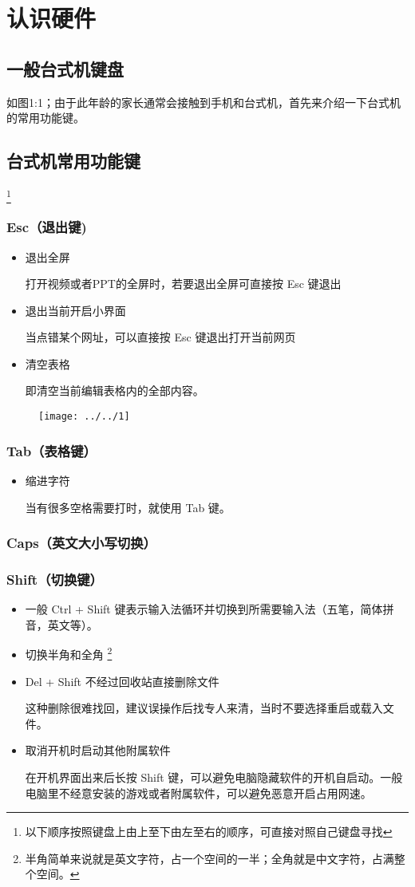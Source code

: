 \chapter{认识硬件}
\section{一般台式机键盘}
如图1:1；由于此年龄的家长通常会接触到手机和台式机，首先来介绍一下台式机的常用功能键。
\section{台式机常用功能键}
\footnote{以下顺序按照键盘上由上至下由左至右的顺序，可直接对照自己键盘寻找}
\subsection{Esc（退出键)}
\begin{itemize}
	\item 退出全屏
	
	打开视频或者PPT的全屏时，若要退出全屏可直接按 Esc 键退出
	\item 退出当前开启小界面
	
	当点错某个网址，可以直接按 Esc 键退出打开当前网页
	\item 清空表格
	
	即清空当前编辑表格内的全部内容。
\end{itemize}
\begin{figure}
	\centering
	\texttt{[image: ../../1]}
	\caption{}
	\label{fig:1}
\end{figure}
\subsection{Tab（表格键）}
\begin{itemize}
	\item 缩进字符
	
	当有很多空格需要打时，就使用 Tab 键。
\end{itemize}
\subsection{Caps（英文大小写切换）}
\subsection{Shift（切换键）}
\begin{itemize}
	\item 一般 Ctrl + Shift 键表示输入法循环并切换到所需要输入法（五笔，简体拼音，英文等）。
	\item 切换半角和全角
	\footnote{半角简单来说就是英文字符，占一个空间的一半；全角就是中文字符，占满整个空间。}
	\item Del + Shift 不经过回收站直接删除文件
	
	这种删除很难找回，建议误操作后找专人来清，当时不要选择重启或载入文件。
	\item {取消开机时启动其他附属软件}
	
	在开机界面出来后长按 Shift 键，可以避免电脑隐藏软件的开机自启动。一般电脑里不经意安装的游戏或者附属软件，可以避免恶意开启占用网速。
\end{itemize}
